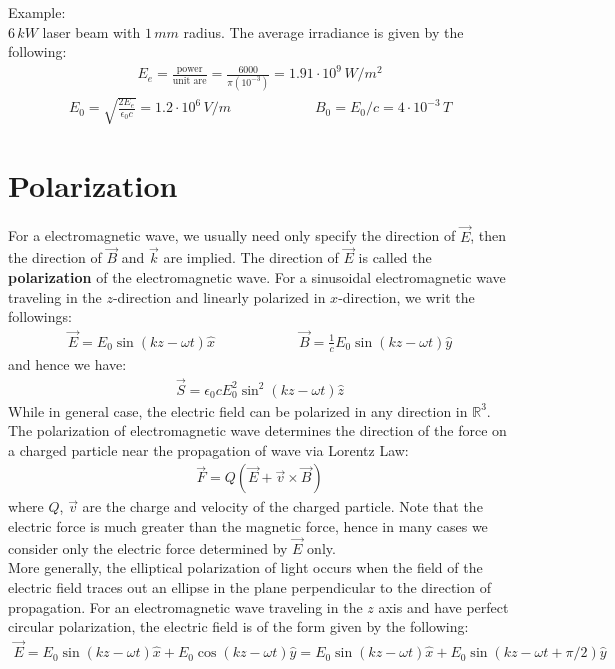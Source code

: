 \documentclass[11pt]{book}
\theoremstyle{break}
\theoremstyle{break}
\newcommand{\R}{\mathbb{R}}
\newcommand{\example}{\color{green}Example: \color{black}}
\begin{document}
\example\\
$6\, kW$ laser beam with $1\, mm$ radius. The average irradiance is given by the following:
\begin{align*}
E_e = \frac{\text{power}}{\text{unit are}} = \frac{6000}{\pi (10^{-3})} = 1.91\cdot 10^9 \, W/m^2
\end{align*}
\begin{align*}
E_0 = \sqrt{\frac{2E_e}{\epsilon_0 c}} = 1.2\cdot 10^6 \, V/m\qquad\qquad\qquad B_0 = E_0 /c = 4\cdot 10^{-3}\, T
\end{align*}




\newpage
\section[Polarization]{\color{red}Polarization\color{black}}
For a electromagnetic wave, we usually need only specify the direction of $\vec{E}$, then the direction of $\vec{B}$ and $\vec{k}$ are implied. The direction of $\vec{E}$ is called the \textbf{polarization} of the electromagnetic wave. For a sinusoidal electromagnetic wave traveling in the $z$-direction and linearly polarized in $x$-direction, we writ the followings:
\begin{align*}
\vec{E} = E_0 \sin(kz - \omega t) \hat{x} \qquad\qquad \qquad \vec{B} = \frac{1}{c}E_0 \sin(kz-\omega t) \hat{y}
\end{align*}
and hence we have:
\begin{align*}
\vec{S} = \epsilon_0 c E_0^2 \sin^2(kz - \omega t)  \hat{z}
\end{align*}
While in general case, the electric field can be polarized in any direction in $\R^3$.\\

The polarization of electromagnetic wave determines the direction of the force on a charged particle near the propagation of wave via Lorentz Law:
\begin{align*}
\vec{F} = Q ( \vec{E}+ \vec{v}\times \vec{B})
\end{align*}
where $Q$, $\vec{v}$ are the charge and velocity of the charged particle. Note that the electric force is much greater than the magnetic force, hence in many cases we consider only the electric force determined by $\vec{E}$ only. \\

More generally, the elliptical polarization of light occurs when the field of the electric field traces out an ellipse in the plane perpendicular to the direction of propagation. For an electromagnetic wave traveling in the $z$ axis and have perfect circular polarization, the electric field is of the form given by the following:
\begin{align*}
\vec{E} = E_0 \sin(kz - \omega t) \hat{x} + E_0 \cos(kz - \omega t) \hat{y} = E_0 \sin(kz - \omega t) \hat{ x} + E_0 \sin(kz - \omega t + \pi/2) \hat{y}
\end{align*}
\end{document}
